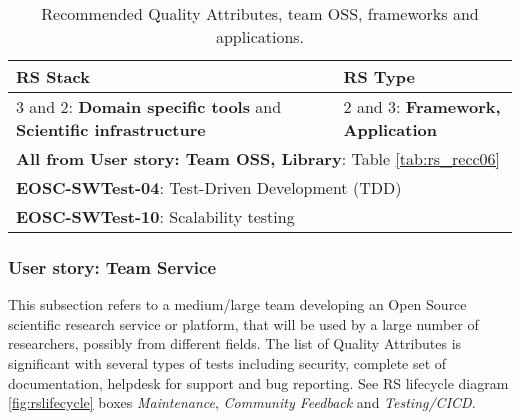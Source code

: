 \begin{center}
\begin{table}

  \small
  \begin{tabular}{|p{0.65\linewidth}|p{0.35\linewidth}|} \hline

    \textbf{RS Stack} & \textbf{RS Type} \\ \hline \hline
    3 and 2: \textbf{Domain specific tools} and  \textbf{Scientific infrastructure} &
    2 and 3: \textbf{Framework, Application} \\ \hline \hline
    \multicolumn{2}{|l|}{\textbf{All from User story: Team OSS, Library}: Table \ref{tab:rs_recc06}} \\ \hline
    \multicolumn{2}{|l|}{\textbf{EOSC-SWTest-04}: Test-Driven Development (TDD)} \\ \hline
    \multicolumn{2}{|l|}{\textbf{EOSC-SWTest-10}: Scalability testing} \\ \hline

  \end{tabular}
  \caption{Recommended Quality Attributes, team OSS, frameworks and applications.}
  \label{tab:rs_recc07}
\end{table}
\end{center}

\subsubsection{User story: Team Service}

This subsection refers to a medium/large team developing an Open Source scientific research service or platform, that will be used by a large number of researchers, possibly from different fields. The list of Quality Attributes is significant with several types of tests including security, complete set of documentation, helpdesk for support and bug reporting. See RS lifecycle diagram \ref{fig:rslifecycle} boxes \textit{Maintenance}, \textit{Community Feedback} and \textit{Testing/CICD}.

